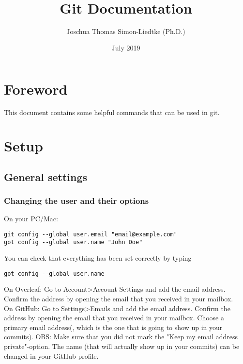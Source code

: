 \documentclass{report}
\title{Git Documentation}
\author{Joschua Thomas Simon-Liedtke (Ph.D.)}
\date{July 2019}
\begin{document}
\maketitle

\chapter*{Foreword}

This document contains some helpful commands that can be used in git.

\tableofcontents

\chapter{Setup}

\section{General settings}

\subsection{Changing the user and their options}

On your PC/Mac:
\begin{verbatim}
git config --global user.email "email@example.com"
got config --global user.name "John Doe"
\end{verbatim}
You can check that everything has been set correctly by typing
\begin{verbatim}
got config --global user.name
\end{verbatim}

On Overleaf:
Go to Account\textgreater  Account Settings and add the email address. Confirm the address by opening the email that you received in your mailbox.
\\

On GitHub:
Go to Settings\textgreater  Emails and add the email address. Confirm the address by opening the email that you received in your mailbox. Choose a primary email address(, which is the one that is going to show up in your commits). OBS: Make sure that you did not mark the "Keep my email address private"-option. The name (that will actually show up in your commits) can be changed in your GitHub profile.
\end{document}
